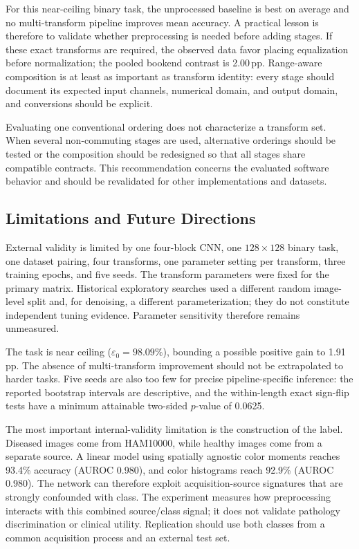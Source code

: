\documentclass[preprint,review,12pt]{elsarticle}
\begin{document}
For this near-ceiling binary task, the unprocessed baseline is best on average and no multi-transform pipeline improves mean accuracy. A practical lesson is therefore to validate whether preprocessing is needed before adding stages. If these exact transforms are required, the observed data favor placing equalization before normalization; the pooled bookend contrast is 2.00\,pp. Range-aware composition is at least as important as transform identity: every stage should document its expected input channels, numerical domain, and output domain, and conversions should be explicit.

Evaluating one conventional ordering does not characterize a transform set. When several non-commuting stages are used, alternative orderings should be tested or the composition should be redesigned so that all stages share compatible contracts. This recommendation concerns the evaluated software behavior and should be revalidated for other implementations and datasets.

\subsection{Limitations and Future Directions}
\label{subsec:limitations}

External validity is limited by one four-block CNN, one $128\times128$ binary task, one dataset pairing, four transforms, one parameter setting per transform, three training epochs, and five seeds. The transform parameters were fixed for the primary matrix. Historical exploratory searches used a different random image-level split and, for denoising, a different parameterization; they do not constitute independent tuning evidence. Parameter sensitivity therefore remains unmeasured.

The task is near ceiling ($\varepsilon_0=98.09\%$), bounding a possible positive gain to 1.91\,pp. The absence of multi-transform improvement should not be extrapolated to harder tasks. Five seeds are also too few for precise pipeline-specific inference: the reported bootstrap intervals are descriptive, and the within-length exact sign-flip tests have a minimum attainable two-sided $p$-value of 0.0625.

The most important internal-validity limitation is the construction of the label. Diseased images come from HAM10000, while healthy images come from a separate source. A linear model using spatially agnostic color moments reaches 93.4\% accuracy (AUROC 0.980), and color histograms reach 92.9\% (AUROC 0.980). The network can therefore exploit acquisition-source signatures that are strongly confounded with class. The experiment measures how preprocessing interacts with this combined source/class signal; it does not validate pathology discrimination or clinical utility. Replication should use both classes from a common acquisition process and an external test set.
\end{document}
